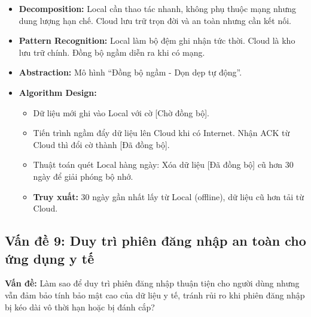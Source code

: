 \documentclass[a4paper,12pt]{article}
\begin{document}
\begin{itemize}
    \item \textbf{Decomposition:} Local cần thao tác nhanh, không phụ thuộc mạng nhưng dung lượng hạn chế. Cloud lưu trữ trọn đời và an toàn nhưng cần kết nối.
    \item \textbf{Pattern Recognition:} Local làm bộ đệm ghi nhận tức thời. Cloud là kho lưu trữ chính. Đồng bộ ngầm diễn ra khi có mạng.
    \item \textbf{Abstraction:} Mô hình ``Đồng bộ ngầm - Dọn dẹp tự động''.
    \item \textbf{Algorithm Design:}
    \begin{itemize}
        \item Dữ liệu mới ghi vào Local với cờ [Chờ đồng bộ].
        \item Tiến trình ngầm đẩy dữ liệu lên Cloud khi có Internet. Nhận ACK từ Cloud thì đổi cờ thành [Đã đồng bộ].
        \item Thuật toán quét Local hàng ngày: Xóa dữ liệu [Đã đồng bộ] cũ hơn 30 ngày để giải phóng bộ nhớ.
        \item \textbf{Truy xuất:} 30 ngày gần nhất lấy từ Local (offline), dữ liệu cũ hơn tải từ Cloud.
    \end{itemize}
\end{itemize}
\subsection{Vấn đề 9: Duy trì phiên đăng nhập an toàn cho ứng dụng y tế}

\textbf{Vấn đề:} Làm sao để duy trì phiên đăng nhập thuận tiện cho người dùng nhưng vẫn đảm bảo tính bảo mật cao của dữ liệu y tế, tránh rủi ro khi phiên đăng nhập bị kéo dài vô thời hạn hoặc bị đánh cắp?
\end{document}

